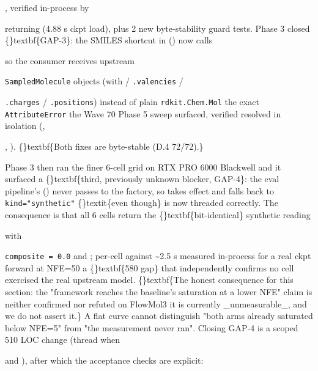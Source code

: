 \documentclass{article}
\begin{document}
, verified in-process by

 returning  (4.88 s ckpt load), plus 2 new byte-stability guard tests. Phase 3 closed \{\}textbf\{GAP-3\}: the SMILES shortcut in  () now calls

 so the consumer receives upstream

\texttt{SampledMolecule} objects (with  / \texttt{.valencies} /

\texttt{.charges} / \texttt{.positions}) instead of plain \texttt{rdkit.Chem.Mol}  the exact \texttt{AttributeError} the Wave 70 Phase 5 sweep surfaced, verified resolved in isolation (,

, ). \{\}textbf\{Both fixes are byte-stable (D.4 72/72).\}

Phase 3 then ran the finer 6-cell grid on RTX PRO 6000 Blackwell  and it surfaced a \{\}textbf\{third, previously unknown blocker, GAP-4\}: the eval pipeline's  () never passes  to the factory, so  takes effect and  falls back to \texttt{kind="synthetic"} \{\}textit\{even though\}  is now threaded correctly. The consequence is that all 6 cells return the \{\}textbf\{bit-identical\} synthetic reading

 with

\texttt{composite = 0.0} and ; per-cell  against \textasciitilde{}2.5 s measured in-process for a real ckpt forward at NFE=50  a \{\}textbf\{580 gap\} that independently confirms no cell exercised the real upstream model. \{\}textbf\{The honest consequence for this section: the "framework reaches the baseline's saturation at a lower NFE" claim is neither confirmed nor refuted on FlowMol3  it is currently \_unmeasurable\_, and we do not assert it.\} A flat curve cannot distinguish "both arms already saturated below NFE=5" from "the measurement never ran". Closing GAP-4 is a scoped 510 LOC change (thread  when

 and ), after which the acceptance checks are explicit:
\end{document}

